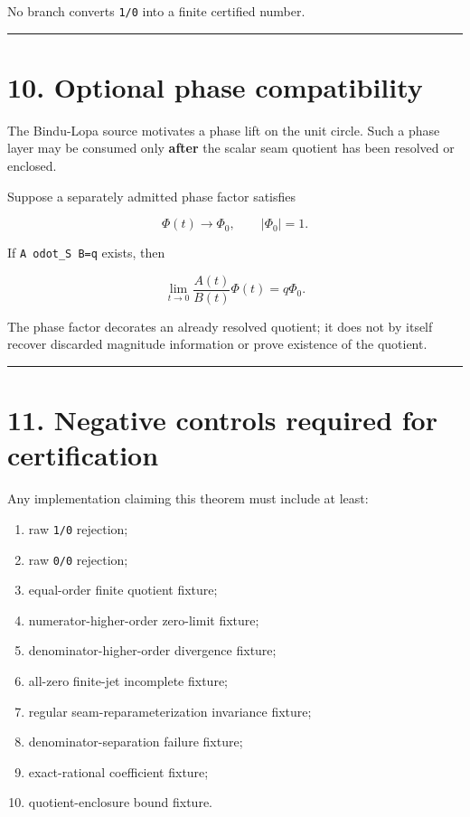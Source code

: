No branch converts \texttt{1/0} into a finite certified number.

\begin{center}\rule{0.5\linewidth}{0.5pt}\end{center}

\hypertarget{optional-phase-compatibility}{%
\section{10. Optional phase compatibility}\label{optional-phase-compatibility}}

The Bindu-Lopa source motivates a phase lift on the unit circle. Such a phase
layer may be consumed only \textbf{after} the scalar seam quotient has been resolved
or enclosed.

Suppose a separately admitted phase factor satisfies

\[
\Phi(t)\to\Phi_0,
\qquad
|\Phi_0|=1.
\]

If \texttt{A\ odot\_S\ B=q} exists, then

\[
\boxed{\lim_{t\to0}\frac{A(t)}{B(t)}\Phi(t)=q\Phi_0.}
\tag{10.1}
\]

The phase factor decorates an already resolved quotient; it does not by itself
recover discarded magnitude information or prove existence of the quotient.

\begin{center}\rule{0.5\linewidth}{0.5pt}\end{center}

\hypertarget{negative-controls-required-for-certification}{%
\section{11. Negative controls required for certification}\label{negative-controls-required-for-certification}}

Any implementation claiming this theorem must include at least:

\begin{enumerate}
\def\labelenumi{\arabic{enumi}.}
\tightlist
\item
  raw \texttt{1/0} rejection;
\item
  raw \texttt{0/0} rejection;
\item
  equal-order finite quotient fixture;
\item
  numerator-higher-order zero-limit fixture;
\item
  denominator-higher-order divergence fixture;
\item
  all-zero finite-jet incomplete fixture;
\item
  regular seam-reparameterization invariance fixture;
\item
  denominator-separation failure fixture;
\item
  exact-rational coefficient fixture;
\item
  quotient-enclosure bound fixture.
\end{enumerate}

